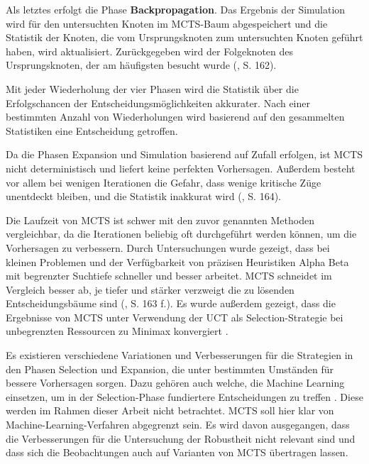 Als letztes erfolgt die Phase \textbf{Backpropagation}. Das Ergebnis der Simulation wird für den untersuchten Knoten im MCTS-Baum abgespeichert und die Statistik der Knoten, die vom Ursprungsknoten zum untersuchten Knoten geführt haben, wird aktualisiert. Zurückgegeben wird der Folgeknoten des Ursprungsknoten, der am häufigsten besucht wurde (\cite{Russell.2020}, S. 162).

Mit jeder Wiederholung der vier Phasen wird die Statistik über die Erfolgschancen der Entscheidungsmöglichkeiten akkurater. Nach einer bestimmten Anzahl von Wiederholungen wird basierend auf den gesammelten Statistiken eine Entscheidung getroffen.

Da die Phasen Expansion und Simulation basierend auf Zufall erfolgen, ist MCTS nicht deterministisch und liefert keine perfekten Vorhersagen. Außerdem besteht vor allem bei wenigen Iterationen die Gefahr, dass wenige kritische Züge unentdeckt bleiben, und die Statistik inakkurat wird (\cite{Russell.2020}, S. 164).

Die Laufzeit von MCTS ist schwer mit den zuvor genannten Methoden vergleichbar, da die Iterationen beliebig oft durchgeführt werden können, um die Vorhersagen zu verbessern. Durch Untersuchungen wurde gezeigt, dass bei kleinen Problemen und der Verfügbarkeit von präzisen Heuristiken Alpha Beta mit begrenzter Suchtiefe schneller und besser arbeitet. MCTS schneidet im Vergleich besser ab, je tiefer und stärker verzweigt die zu lösenden Entscheidungsbäume sind (\cite{Russell.2020}, S. 163 f.). Es wurde außerdem gezeigt, dass die Ergebnisse von MCTS unter Verwendung der UCT als Selection-Strategie bei unbegrenzten Ressourcen zu Minimax konvergiert \cite{Browne.2012}.

Es existieren verschiedene Variationen und Verbesserungen für die Strategien in den Phasen Selection und Expansion, die unter bestimmten Umständen für bessere Vorhersagen sorgen. Dazu gehören auch welche, die Machine Learning einsetzen, um in der Selection-Phase fundiertere Entscheidungen zu treffen \cite{Browne.2012}. Diese werden im Rahmen dieser Arbeit nicht betrachtet. MCTS soll hier klar von Machine-Learning-Verfahren abgegrenzt sein. Es wird davon ausgegangen, dass die Verbesserungen für die Untersuchung der Robustheit nicht relevant sind und dass sich die Beobachtungen auch auf Varianten von MCTS übertragen lassen.
